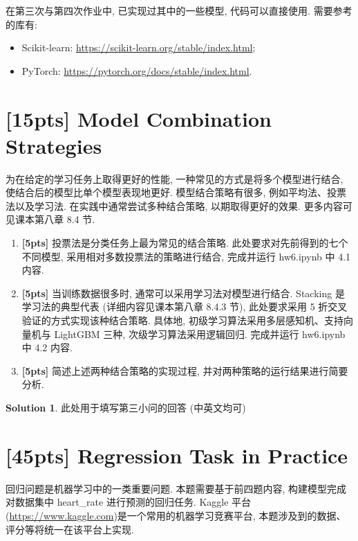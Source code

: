 \documentclass[a4paper,UTF8]{article}
\numberwithin{equation}{section}
\numberwithin{equation}{section}
\theoremstyle{definition}
\newtheorem*{solution}{Solution}
\begin{document}
在第三次与第四次作业中, 已实现过其中的一些模型, 代码可以直接使用. 需要参考的库有:

\begin{itemize}
    \item Scikit-learn: \href{https://scikit-learn.org/stable/index.html}{https://scikit-learn.org/stable/index.html};
    \item PyTorch: \href{https://pytorch.org/docs/stable/index.html}{https://pytorch.org/docs/stable/index.html}.
\end{itemize}

\newpage

\section{[15pts] Model Combination Strategies}

为在给定的学习任务上取得更好的性能, 一种常见的方式是将多个模型进行结合, 使结合后的模型比单个模型表现地更好. 
模型结合策略有很多, 例如平均法、投票法以及学习法.
在实践中通常尝试多种结合策略, 以期取得更好的效果.
更多内容可见课本第八章 8.4 节.

\begin{enumerate}
    \item[(1)] \textbf{[5pts]} 投票法是分类任务上最为常见的结合策略. 此处要求对先前得到的七个不同模型, 采用相对多数投票法的策略进行结合, 完成并运行 hw6.ipynb 中 4.1 内容.
    \item[(2)] \textbf{[5pts]} 当训练数据很多时, 通常可以采用学习法对模型进行结合. Stacking 是学习法的典型代表 (详细内容见课本第八章 8.4.3 节), 此处要求采用 5 折交叉验证的方式实现该种结合策略. 具体地, 初级学习算法采用多层感知机、支持向量机与 LightGBM 三种, 次级学习算法采用逻辑回归. 完成并运行 hw6.ipynb 中 4.2 内容.
    \item[(3)] \textbf{[5pts]} 简述上述两种结合策略的实现过程, 并对两种策略的运行结果进行简要分析. 
\end{enumerate}

\begin{solution}
	此处用于填写第三小问的回答 (中英文均可)
\end{solution}

\newpage

\section{[45pts] Regression Task in Practice}
回归问题是机器学习中的一类重要问题. 本题需要基于前四题内容, 构建模型完成对数据集中 heart\_rate  进行预测的回归任务. Kaggle 平台(\href{https://www.kaggle.com}{https://www.kaggle.com})是一个常用的机器学习竞赛平台, 本题涉及到的数据、评分等将统一在该平台上实现.
\end{document}
